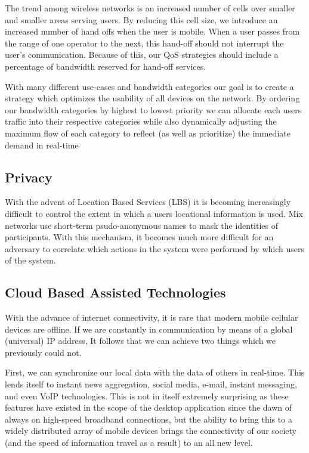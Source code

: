 \documentclass[a4paper,12pt]{report}
\begin{document}
The trend among wireless networks is an increased number of cells over smaller and smaller areas serving users. By reducing this cell size, we introduce an increased number of hand offs when the user is mobile. When a user passes from the range of one operator to the next, this hand-off should not interrupt the user's communication. Because of this, our QoS strategies should include a percentage of bandwidth reserved for hand-off services. 

With many different use-cases and bandwidth categories our goal is to create a strategy which optimizes the usability of all devices on the network. By ordering our bandwidth categories by highest to lowest priority we can allocate each users traffic into their respective categories while also dynamically adjusting the maximum flow of each category to reflect (as well as prioritize) the immediate demand in real-time
\cite{5710522}
\cite{1300874}
\cite{1376696}
\subsection{Privacy}
\cite{4698190}
\cite{4471983}

With the advent of Location Based Services (LBS) it is becoming increasingly difficult to control the extent in which a users locational information is used. Mix networks use short-term psudo-anonymous names to mask the identities of participants. With this mechanism, it becomes much more difficult for an adversary to correlate which actions in the system were performed by which users of the system.
\cite{6270872}
\cite{freudiger2007mix}
\cite{1032602}
\subsection{Cloud Based Assisted Technologies}

With the advance of internet connectivity, it is rare that modern mobile cellular devices are offline. If we are constantly in communication by means of a global (universal) IP address, It follows that we can achieve two things which we previously could not. 

First, we can synchronize our local data with the data of others in real-time. This lends itself to instant news aggregation, social media, e-mail, instant messaging, and even VoIP technologies. This is not in itself extremely surprising as these features have existed in the scope of the desktop application since the dawn of always on high-speed broadband connections, but the ability to bring this to a widely distributed array of mobile devices brings the connectivity of our society (and the speed of information travel as a result) to an all new level.
\end{document}
